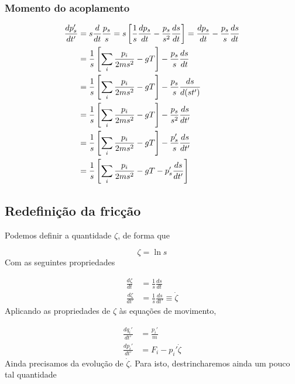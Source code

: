 \documentclass[twoside, a4paper]{scrartcl}
\newcommand{\deri}[2]{\frac{d #1}{d #2}}
\begin{document}
\subsubsection*{Momento do acoplamento}

\begin{align}
	\deri{p_s'}{t'} &=  s \deri{}{t} \frac{p_s}{s} = s \left[ \frac{1}{s}\deri{p_s}{t} - \frac{p_s}{s^2}\deri{s}{t}\right] = 
	  \deri{p_s}{t} - \frac{p_s}{s}\deri{s}{t} \notag \\
	  &= \frac{1}{s} \left[ \sum_i \frac{p_i}{2ms^2} - gT \right] - \frac{p_s}{s}\deri{s}{t} \notag \\
	  &= \frac{1}{s} \left[ \sum_i \frac{p_i}{2ms^2} - gT \right] - \frac{p_s}{s}\deri{s}{(st')} \notag \\
	  &= \frac{1}{s} \left[ \sum_i \frac{p_i}{2ms^2} - gT \right] - \frac{p_s}{s^2}\deri{s}{t'} \notag \\
	  &= \frac{1}{s} \left[ \sum_i \frac{p_i}{2ms^2} - gT \right] - \frac{p_s'}{s}\deri{s}{t'} \notag \\
	  &= \frac{1}{s} \left[ \sum_i \frac{p_i}{2ms^2} - gT- p_s'\deri{s}{t'} \right]  
\end{align}

\subsection{Redefinição da fricção}

Podemos definir a quantidade $\zeta$, de forma que 

\begin{equation}
	\zeta = \ln s
\end{equation}
Com as seguintes propriedades

\begin{subequations}
\begin{align}
	\deri{\zeta}{t} &= \frac{1}{s}\deri{s}{t}\\
	\deri{\zeta}{t'} &= \frac{1}{s}\deri{s}{t'} \equiv \dot{\zeta}
\end{align}
\end{subequations}
Aplicando as propriedades de $\zeta$ às equações de movimento,

\begin{subequations}
\begin{align}
	\deri{q_i'}{t'} &= \frac{p_i'}{m} \\
	\deri{p_i'}{t'} &= F_i - p_i' \dot{\zeta}
\end{align}
\end{subequations}
Ainda precisamos da evolução de $\dot{\zeta}$. Para isto, destrincharemos ainda um pouco tal quantidade
\end{document}
